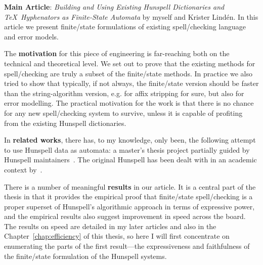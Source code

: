 \documentclass[officiallayout]{unihelcompling}
\begin{document}
\textbf{Main Article}: \emph{Building and Using Existing Hunspell Dictionaries
and \TeX\ Hyphenators as Finite-State Automata} by myself and Krister Lindén.
In this article we present finite\-/state formulations of existing spell\-/checking
language and error models.

The \textbf{motivation} for this piece of engineering is far-reaching both on
the technical and theoretical level. We set out to prove that the existing
methods for spell\-/checking are truly a subset of the finite\-/state methods.
In practice we also tried to show that typically, if not always, the
finite\-/state version should be faster than the string-algorithm version, e.g. for
affix stripping for sure, but also for error modelling. The practical
motivation for the work is that there is no chance for any new spell\-/checking
system to survive, unless it is capable of profiting from the existing Hunspell
dictionaries.

In \textbf{related works}, there has, to my knowledge, only been, the following
attempt to use Hunspell data as automata: a master's thesis project partially
guided by Hunspell maintainers~\citep{greenfield2010open}.
The
original Hunspell has been dealt with in an academic context 
by~\citet{tron2005hunmorph}.

There is a number of meaningful \textbf{results} in our article. It
is a central part of the thesis in that it provides the empirical proof that
finite\-/state spell\-/checking is a proper superset of Hunspell's algorithmic 
approach in terms of expressive power, and the empirical results also suggest
improvement in speed across the board. The results on speed are detailed in my
later articles and also in the Chapter~\ref{chap:efficiency} of this thesis,
so here I will first concentrate on enumerating the parts of the first
result---the expressiveness and faithfulness of the finite\-/state formulation of
the Hunspell systems.
\end{document}
